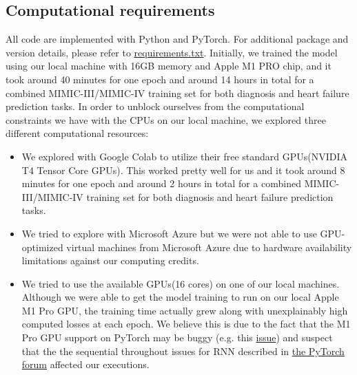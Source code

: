 \documentclass[11pt,a4paper,fleqn]{article}
\begin{document}
\subsection{Computational requirements}
All code are implemented with Python and PyTorch. For additional package and
version details, please refer to
\href{https://github.com/willtsai/dlh-sp23-team53/blob/main/requirements.txt}{requirements.txt}.
Initially, we trained the model using our local machine with 16GB memory
and Apple M1 PRO chip, and it took around 40 minutes for one epoch and around 14 hours in total 
for a combined MIMIC-III/MIMIC-IV training set for both diagnosis and heart failure prediction
tasks. In order to unblock ourselves from the computational constraints we have with the CPUs on
our local machine, we explored three different computational resources:
\begin{itemize}
  \item We explored with Google Colab to utilize their free standard 
  GPUs(NVIDIA T4 Tensor Core GPUs). This worked pretty well for us and it took around 8 minutes for one epoch and around 2 hours in total 
  for a combined MIMIC-III/MIMIC-IV training set for both diagnosis and heart failure prediction
  tasks.
  \item We tried to explore with Microsoft Azure but we were not able to use GPU-optimized virtual machines from Microsoft Azure due
  to hardware availability limitations against our computing credits.
  \item We tried to use the available GPUs(16 cores) on one of our local
  machines. Although we were able to get the model training to run on our local Apple M1 Pro
  GPU, the training time actually grew along with unexplainably high computed
  losses at each epoch. We believe this is due to the fact that the M1 Pro GPU
  support on PyTorch may be buggy (e.g. this
  \hyperlink{https://github.com/pytorch/pytorch/issues/77799}{issue}) and suspect
  that the the sequential throughout issues for RNN described in
  \hyperlink{https://discuss.pytorch.org/t/sequential-throughput-of-gpu-execution/156303}{the
  PyTorch forum} \cite{pytorch_forum} affected our executions.
\end{itemize}
\end{document}
